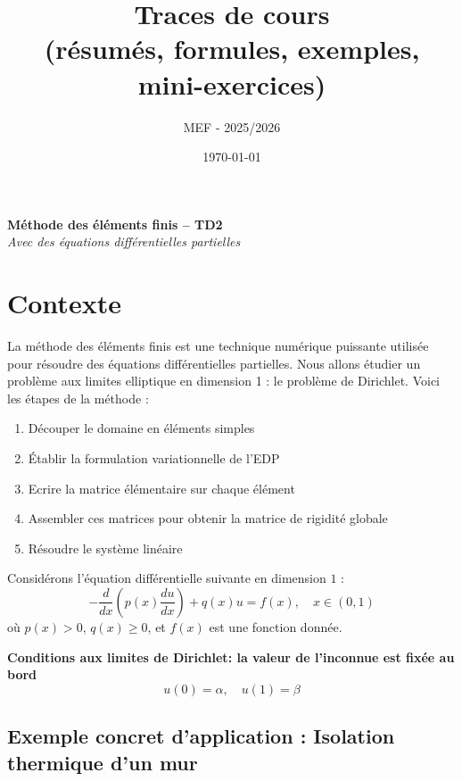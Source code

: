 \documentclass[11pt,a4paper]{report}
\title{\textbf{Traces de cours}\\\large (résumés, formules, exemples, mini-exercices)}
\author{ MEF - 2025/2026 }
\date{\today}
\begin{document}
\begin{center}
    {\LARGE \textbf{Méthode des éléments finis -- TD2}}\\[1em]
    {\large \textit{Avec des équations différentielles partielles}}
\end{center}
\section*{Contexte}
La méthode des éléments finis est une technique numérique puissante utilisée pour résoudre des équations différentielles partielles. Nous allons étudier un problème aux limites elliptique en dimension 1 : le problème de Dirichlet. 
Voici les étapes de la méthode :
\begin{enumerate}
    \item Découper le domaine en éléments simples
    \item Établir la formulation variationnelle de l'EDP
    \item Ecrire la matrice élémentaire sur chaque élément
    \item Assembler ces matrices pour obtenir la matrice de rigidité globale
    \item Résoudre le système linéaire
\end{enumerate}


Considérons l'équation différentielle suivante en dimension $1$ :
\[
- \frac{d}{dx} \left( p(x) \frac{du}{dx} \right) + q(x) u = f(x), \quad x \in (0, 1)
\]
où \( p(x) > 0 \), \( q(x) \geq 0 \), et \( f(x) \) est une fonction donnée.

\textbf{Conditions aux limites de Dirichlet: la valeur de l'inconnue est fixée au bord}
\[
u(0) = \alpha, \quad u(1) = \beta
\]

\subsection*{Exemple concret d'application : Isolation thermique d'un mur}
\end{document}
